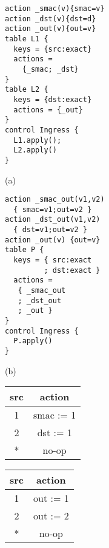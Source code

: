 \begin{figure}
\centering
\begin{minipage}[t]{.23\textwidth}
\centering
\begin{framed}\hspace{-.5em}
\begin{lstlisting}[basicstyle=\ttfamily\footnotesize, lineskip = 0em,numbersep=0pt,resetmargins=true, xleftmargin=-1em]
action _smac(v){smac=v}
action _dst(v){dst=d}
action _out(v){out=v}
table L1 {
  keys = {src:exact}
  actions =
    {_smac; _dst}
}
table L2 {
  keys = {dst:exact}
  actions = {_out}
}
control Ingress {
  L1.apply();
  L2.apply()
}
\end{lstlisting}
\end{framed}
(a)
\end{minipage}
\begin{minipage}[t]{.23\textwidth}
\centering
\begin{framed}\hspace{-1em}
\begin{lstlisting}[basicstyle=\ttfamily\footnotesize, lineskip = 0em,numbersep=0pt,resetmargins=true, xleftmargin=-1em]
action _smac_out(v1,v2)
  { smac=v1;out=v2 }
action _dst_out(v1,v2)
  { dst=v1;out=v2 }
action _out(v) {out=v}
table P {
  keys = { src:exact
         ; dst:exact }
  actions =
   { _smac_out
   ; _dst_out
   ; _out }
}
control Ingress {
  P.apply()
}
\end{lstlisting}
\end{framed}
(b)
\end{minipage}

\begin{ttfamily}
\begin{footnotesize}
\setlength{\columnsep}{0pt}
\begin{multicols}{3}
\begin{tabular}{c|c}
 {\ttfamily src} & action \\\hline
       1         & smac := 1 \\
       2         & dst := 1 \\
       *         & no-op
\end{tabular}

\columnbreak

\begin{tabular}{c|c}
 {\ttfamily src} & action \\\hline
       1         & out := 1 \\
       2         & out := 2 \\
       *         & no-op
\end{tabular}


\end{multicols}
\end{footnotesize}
\end{ttfamily}
\end{figure}
